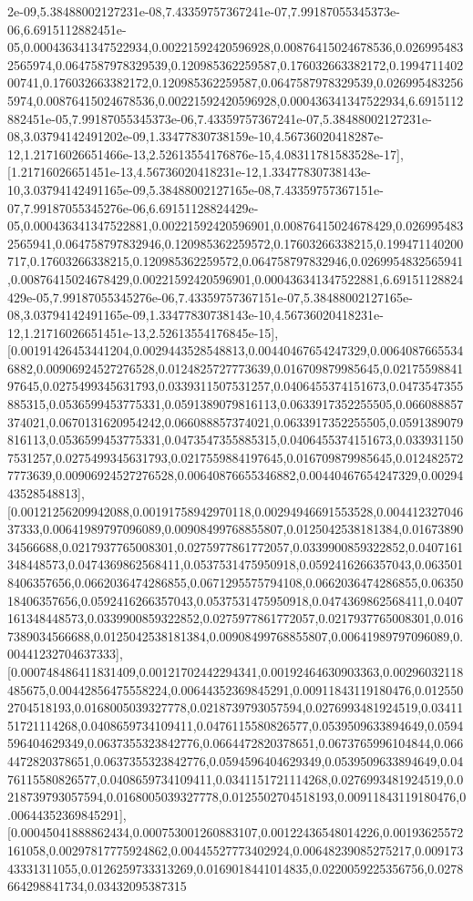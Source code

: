 \documentclass{article}
\begin{document}
2e-09,5.38488002127231e-08,7.43359757367241e-07,7.99187055345373e-06,6.6915112882451e-05,0.000436341347522934,0.00221592420596928,0.00876415024678536,0.0269954832565974,0.0647587978329539,0.120985362259587,0.176032663382172,0.199471140200741,0.176032663382172,0.120985362259587,0.0647587978329539,0.0269954832565974,0.00876415024678536,0.00221592420596928,0.000436341347522934,6.6915112882451e-05,7.99187055345373e-06,7.43359757367241e-07,5.38488002127231e-08,3.03794142491202e-09,1.33477830738159e-10,4.56736020418287e-12,1.21716026651466e-13,2.52613554176876e-15,4.08311781583528e-17],[1.21716026651451e-13,4.56736020418231e-12,1.33477830738143e-10,3.03794142491165e-09,5.38488002127165e-08,7.43359757367151e-07,7.99187055345276e-06,6.69151128824429e-05,0.000436341347522881,0.00221592420596901,0.00876415024678429,0.0269954832565941,0.064758797832946,0.120985362259572,0.17603266338215,0.199471140200717,0.17603266338215,0.120985362259572,0.064758797832946,0.0269954832565941,0.00876415024678429,0.00221592420596901,0.000436341347522881,6.69151128824429e-05,7.99187055345276e-06,7.43359757367151e-07,5.38488002127165e-08,3.03794142491165e-09,1.33477830738143e-10,4.56736020418231e-12,1.21716026651451e-13,2.52613554176845e-15],[0.00191426453441204,0.0029443528548813,0.00440467654247329,0.00640876655346882,0.00906924527276528,0.0124825727773639,0.016709879985645,0.0217559884197645,0.0275499345631793,0.0339311507531257,0.0406455374151673,0.0473547355885315,0.0536599453775331,0.0591389079816113,0.0633917352255505,0.066088857374021,0.0670131620954242,0.066088857374021,0.0633917352255505,0.0591389079816113,0.0536599453775331,0.0473547355885315,0.0406455374151673,0.0339311507531257,0.0275499345631793,0.0217559884197645,0.016709879985645,0.0124825727773639,0.00906924527276528,0.00640876655346882,0.00440467654247329,0.0029443528548813],[0.00121256209942088,0.00191758942970118,0.00294946691553528,0.00441232704637333,0.00641989797096089,0.00908499768855807,0.0125042538181384,0.0167389034566688,0.0217937765008301,0.0275977861772057,0.0339900859322852,0.0407161348448573,0.0474369862568411,0.0537531475950918,0.0592416266357043,0.0635018406357656,0.0662036474286855,0.0671295575794108,0.0662036474286855,0.0635018406357656,0.0592416266357043,0.0537531475950918,0.0474369862568411,0.0407161348448573,0.0339900859322852,0.0275977861772057,0.0217937765008301,0.0167389034566688,0.0125042538181384,0.00908499768855807,0.00641989797096089,0.00441232704637333],[0.000748486411831409,0.00121702442294341,0.00192464630903363,0.00296032118485675,0.00442856475558224,0.00644352369845291,0.00911843119180476,0.0125502704518193,0.0168005039327778,0.0218739793057594,0.0276993481924519,0.0341151721114268,0.0408659734109411,0.0476115580826577,0.0539509633894649,0.0594596404629349,0.0637355323842776,0.0664472820378651,0.0673765996104844,0.0664472820378651,0.0637355323842776,0.0594596404629349,0.0539509633894649,0.0476115580826577,0.0408659734109411,0.0341151721114268,0.0276993481924519,0.0218739793057594,0.0168005039327778,0.0125502704518193,0.00911843119180476,0.00644352369845291],[0.00045041888862434,0.000753001260883107,0.00122436548014226,0.00193625572161058,0.00297817775924862,0.00445527773402924,0.00648239085275217,0.00917343331311055,0.0126259733313269,0.0169018441014835,0.0220059225356756,0.0278664298841734,0.03432095387315
\end{document}

